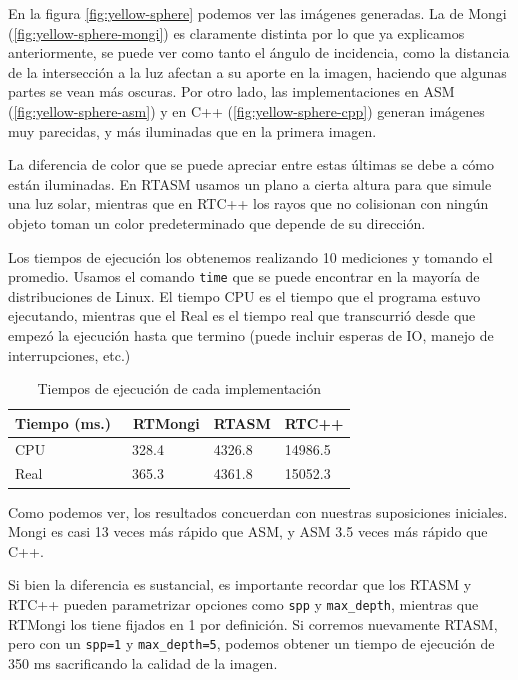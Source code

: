 En la figura \ref{fig:yellow-sphere} podemos ver las imágenes generadas. La de
Mongi (\ref{fig:yellow-sphere-mongi}) es claramente distinta por lo que ya
explicamos anteriormente, se puede ver como tanto el ángulo de incidencia, como
la distancia de la intersección a la luz afectan a su aporte en la imagen,
haciendo que algunas partes se vean más oscuras. Por otro lado, las
implementaciones en ASM (\ref{fig:yellow-sphere-asm}) y en C++
(\ref{fig:yellow-sphere-cpp}) generan imágenes muy parecidas, y más iluminadas
que en la primera imagen.

La diferencia de color que se puede apreciar entre estas últimas se debe a cómo
están iluminadas. En RTASM usamos un plano a cierta altura para que simule una luz
solar, mientras que en RTC++ los rayos que no colisionan con ningún objeto toman
un color predeterminado que depende de su dirección.

Los tiempos de ejecución los obtenemos realizando 10 mediciones y tomando el
promedio. Usamos el comando \texttt{time} que se puede encontrar en la mayoría de
distribuciones de Linux. El tiempo CPU es el tiempo que el programa estuvo
ejecutando, mientras que el Real es el tiempo real que transcurrió desde que
empezó la ejecución hasta que termino (puede incluir esperas de IO,
manejo de interrupciones, etc.)

\begin{table}
  \centering
  \begin{tabular}[t]{l l l l}
    Tiempo (ms.) & \vline~RTMongi & RTASM  & RTC++   \\
    \hline
    CPU          & \vline~328.4   & 4326.8 & 14986.5 \\
    Real         & \vline~365.3   & 4361.8 & 15052.3 \\
  \end{tabular}
  \caption{Tiempos de ejecución de cada implementación}
  \label{tbl:impl-time-diff}
\end{table}

Como podemos ver, los resultados concuerdan con nuestras suposiciones iniciales.
Mongi es casi 13 veces más rápido que ASM, y ASM 3.5 veces más rápido que C++.

Si bien la diferencia es sustancial, es importante recordar que los RTASM y
RTC++ pueden parametrizar opciones como \texttt{spp} y \texttt{max\_depth},
mientras que RTMongi los tiene fijados en 1 por definición. Si corremos
nuevamente RTASM, pero con un \texttt{spp=1} y \texttt{max\_depth=5}, podemos obtener un
tiempo de ejecución de 350 ms sacrificando la calidad de la imagen.

